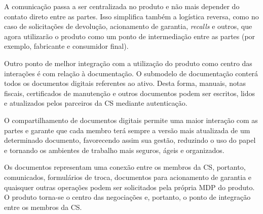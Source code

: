A comunicação passa a ser centralizada no produto e não mais depender do contato direto entre as partes. Isso simplifica também a logística reversa, como no caso de solicitações de devolução, acionamento de garantia, \textit{recalls} e outros, que agora utilizarão o produto como um ponto de intermediação entre as partes (por exemplo, fabricante e consumidor final).

Outro ponto de melhor integração com a utilização do produto como centro das interações é com relação à documentação. O submodelo de documentação conterá todos os documentos digitais referentes ao ativo. Desta forma, manuais, notas fiscais, certificados de manutenção e outros documentos podem ser escritos, lidos e atualizados pelos parceiros da CS mediante autenticação.

O compartilhamento de documentos digitais permite uma maior interação com as partes e garante que cada membro terá sempre a versão mais atualizada de um determinado documento, favorecendo assim sua gestão, reduzindo o uso do papel e tornando os ambientes de trabalho mais seguros, ágeis e organizados.

Os documentos representam uma conexão entre os membros da CS, portanto, comunicados, formulários de troca, documentos para acionamento de garantia e quaisquer outras operações podem ser solicitados pela própria MDP do produto. O produto torna-se o centro das negociações e, portanto, o ponto de integração entre os membros da CS.
